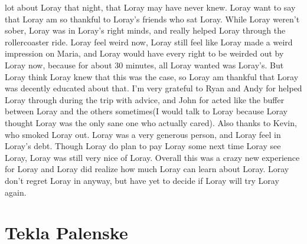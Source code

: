 \documentclass[12pt]{book}
\begin{document}
lot about Loray that night, that Loray may have never knew. Loray want to say that Loray am so thankful to Loray's friends who sat Loray. While Loray weren't sober, Loray was in Loray's right minds, and really helped Loray through the rollercoaster ride. Loray feel weird now, Loray still feel like Loray made a weird impression on Maria, and Loray would have every right to be weirded out by Loray now, because for about 30 minutes, all Loray wanted was Loray's. But Loray think Loray knew that this was the case, so Loray am thankful that Loray was decently educated about that. I'm very grateful to Ryan and Andy for helped Loray through during the trip with advice, and John for acted like the buffer between Loray and the others sometimes(I would talk to Loray because Loray thought Loray was the only sane one who actually cared). Also thanks to Kevin, who smoked Loray out. Loray was a very generous person, and Loray feel in Loray's debt. Though Loray do plan to pay Loray some next time Loray see Loray, Loray was still very nice of Loray. Overall this was a crazy new experience for Loray and Loray did realize how much Loray can learn about Loray. Loray don't regret Loray in anyway, but have yet to decide if Loray will try Loray again.






\chapter{Tekla Palenske}
\end{document}
